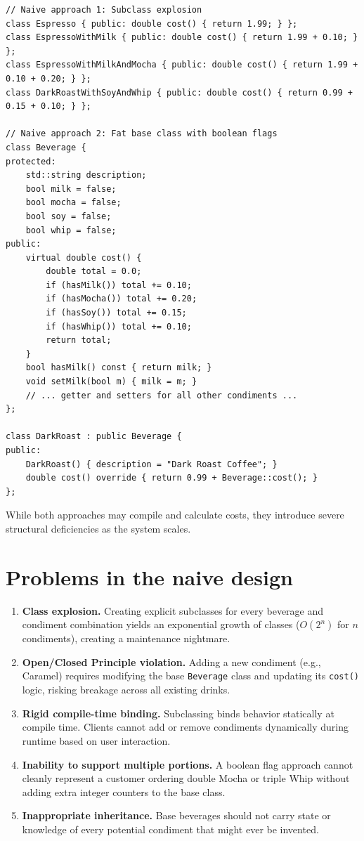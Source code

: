 \documentclass[11pt,a4paper]{report}
\begin{document}
\begin{lstlisting}[style=cpp]
// Naive approach 1: Subclass explosion
class Espresso { public: double cost() { return 1.99; } };
class EspressoWithMilk { public: double cost() { return 1.99 + 0.10; } };
class EspressoWithMilkAndMocha { public: double cost() { return 1.99 + 0.10 + 0.20; } };
class DarkRoastWithSoyAndWhip { public: double cost() { return 0.99 + 0.15 + 0.10; } };

// Naive approach 2: Fat base class with boolean flags
class Beverage {
protected:
    std::string description;
    bool milk = false;
    bool mocha = false;
    bool soy = false;
    bool whip = false;
public:
    virtual double cost() {
        double total = 0.0;
        if (hasMilk()) total += 0.10;
        if (hasMocha()) total += 0.20;
        if (hasSoy()) total += 0.15;
        if (hasWhip()) total += 0.10;
        return total;
    }
    bool hasMilk() const { return milk; }
    void setMilk(bool m) { milk = m; }
    // ... getter and setters for all other condiments ...
};

class DarkRoast : public Beverage {
public:
    DarkRoast() { description = "Dark Roast Coffee"; }
    double cost() override { return 0.99 + Beverage::cost(); }
};
\end{lstlisting}

While both approaches may compile and calculate costs, they introduce severe structural deficiencies as the system scales.

\section{Problems in the naive design}
\begin{enumerate}
  \item \textbf{Class explosion.} Creating explicit subclasses for every beverage and condiment combination yields an exponential growth of classes ($O(2^n)$ for $n$ condiments), creating a maintenance nightmare.
  \item \textbf{Open/Closed Principle violation.} Adding a new condiment (e.g., Caramel) requires modifying the base \texttt{Beverage} class and updating its \texttt{cost()} logic, risking breakage across all existing drinks.
  \item \textbf{Rigid compile-time binding.} Subclassing binds behavior statically at compile time. Clients cannot add or remove condiments dynamically during runtime based on user interaction.
  \item \textbf{Inability to support multiple portions.} A boolean flag approach cannot cleanly represent a customer ordering double Mocha or triple Whip without adding extra integer counters to the base class.
  \item \textbf{Inappropriate inheritance.} Base beverages should not carry state or knowledge of every potential condiment that might ever be invented.
\end{enumerate}
\end{document}
